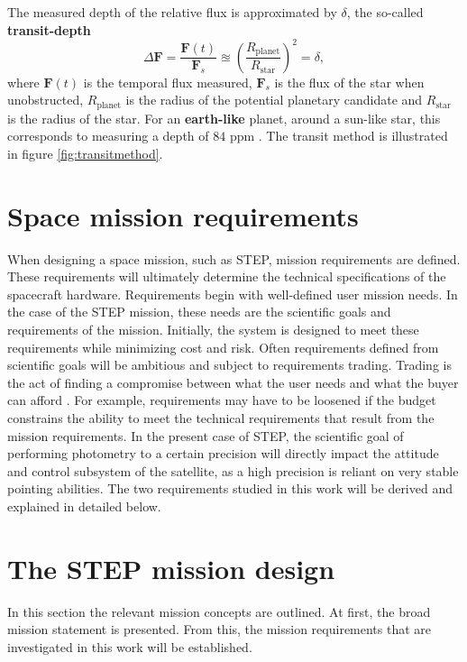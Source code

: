\documentclass[../main.tex]{subfiles}
\begin{document}
	The measured depth of the relative flux is approximated by $\delta$, the so-called \textbf{transit-depth} \cite{seagerintrotoexoplanets}
	\begin{equation}
		\Delta \bm F = \frac{\bm F(t)}{\bm F_s} \approxeq \left(\frac{R_\text{planet}}{R_\text{star}}\right)^2 = \delta,
	\end{equation}
	where $\bm F(t)$ is the temporal flux measured, $\bm F_s$ is the flux of the star when unobstructed, $R_\text{planet}$ is the radius of the potential planetary candidate and $R_\text{star}$ is the radius of the star. For an \textbf{earth-like} planet, around a sun-like star, this corresponds to measuring a depth of $84$ ppm \cite{cubesatexoplanet}. The transit method is illustrated in figure \ref{fig:transitmethod}.
	
	\section{Space mission requirements}
	When designing a space mission, such as STEP, mission requirements are defined. These requirements will ultimately determine the technical specifications of the spacecraft hardware. Requirements begin with well-defined user mission needs. In the case of the STEP mission, these needs are the scientific goals and requirements of the mission. Initially, the system is designed to meet these requirements while minimizing cost and risk. Often requirements defined from scientific goals will be ambitious and subject to requirements trading. Trading is the act of finding a compromise between what the user needs and what the buyer can afford \cite{SMAD}. For example, requirements may have to be loosened if the budget constrains the ability to meet the technical requirements that result from the mission requirements. In the present case of STEP, the scientific goal of performing photometry to a certain precision will directly impact the attitude and control subsystem of the satellite, as a high precision is reliant on very stable pointing abilities. The two requirements studied in this work will be derived and explained in detailed below.
	
	\section{The STEP mission design}
	In this section the relevant mission concepts are outlined. At first, the broad mission statement is presented. From this, the mission requirements that are investigated in this work will be established. 
	
\end{document}
